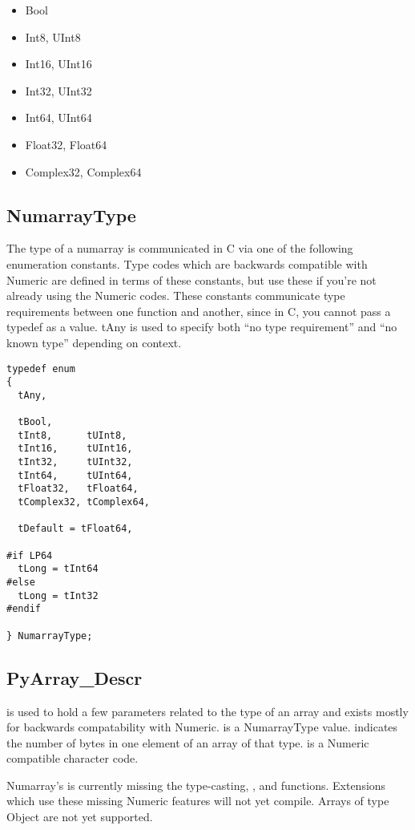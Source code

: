 \begin{itemize}
\item Bool                
\item Int8,      UInt8
\item Int16,     UInt16
\item Int32,     UInt32
\item Int64,     UInt64
\item Float32,   Float64
\item Complex32, Complex64
\end{itemize}

\subsection{NumarrayType}

The type of a numarray is communicated in C via one of the following
enumeration constants.  Type codes which are backwards compatible with Numeric
are defined in terms of these constants, but use these if you're not already
using the Numeric codes.  These constants communicate type requirements between
one function and another, since in C, you cannot pass a typedef as a value.
tAny is used to specify both ``no type requirement'' and ``no known type''
depending on context.   

\begin{verbatim}
typedef enum 
{
  tAny,

  tBool,
  tInt8,      tUInt8,
  tInt16,     tUInt16,
  tInt32,     tUInt32, 
  tInt64,     tUInt64,
  tFloat32,   tFloat64,
  tComplex32, tComplex64,

  tDefault = tFloat64,

#if LP64
  tLong = tInt64
#else
  tLong = tInt32
#endif

} NumarrayType;
\end{verbatim}

\subsection{PyArray_Descr}

 is used to hold a few parameters related to the type of
an array and exists mostly for backwards compatability with Numeric.
 is a NumarrayType value.   indicates the number of
bytes in one element of an array of that type.   is a Numeric
compatible character code.

Numarray's  is currently missing the type-casting,
, and  functions.  Extensions which use these
missing Numeric features will not yet compile.  Arrays of type Object are not
yet supported.

